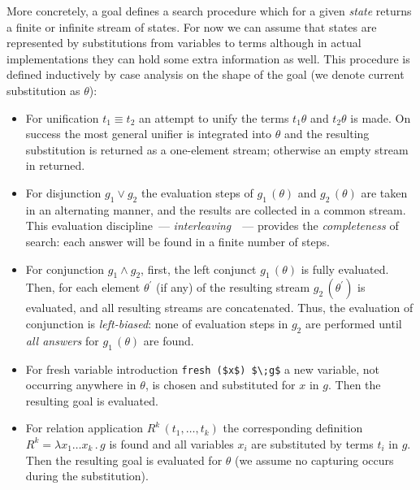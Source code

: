 More concretely, a goal defines a search procedure which for a given \emph{state} returns a finite or infinite stream of states. For now we can assume that states are represented by
substitutions from variables to terms although in actual implementations they can hold some extra information as well. This procedure is defined inductively by case analysis on the
shape of the goal (we denote current substitution as $\theta$):

\begin{itemize}
\item For unification $t_1 \equiv t_2$ an attempt to unify the terms $t_1\theta$ and $t_2\theta$ is made. On success the most general unifier is integrated into $\theta$ and the resulting substitution
  is returned as a one-element stream; otherwise an empty stream in returned.

\item For disjunction $g_1 \vee g_2$ the evaluation steps of $g_1\,(\theta)$ and $g_2\,(\theta)$ are taken in an alternating manner, and the results are collected in a common stream. This evaluation
  discipline~--- \emph{interleaving}~\cite{fair:interleaving}~--- provides the \emph{completeness} of \mk search: each answer will be found in a finite number of steps.

\item For conjunction $g_1 \wedge g_2$, first, the left conjunct $g_1\,(\theta)$ is fully evaluated. Then, for each element $\theta^\prime$ (if any) of the resulting stream $g_2\,(\theta^\prime)$ is
  evaluated, and all resulting streams are concatenated. Thus, the evaluation of conjunction is \emph{left-biased}: none of evaluation steps in $g_2$ are performed until \emph{all answers} for
  $g_1\,(\theta)$ are found.

\item For fresh variable introduction \lstinline|fresh ($x$) $\;g$| a new variable, not occurring anywhere in $\theta$, is chosen and substituted for $x$ in $g$. Then the resulting goal is evaluated.

\item For relation application $R^k\,(t_1,\dots,t_k)$ the corresponding definition $R^k=\lambda x_1\dots x_k\,.\,g$ is found and all variables $x_i$ are substituted by terms $t_i$ in
  $g$. Then the resulting goal is evaluated for $\theta$ (we assume no capturing occurs during the substitution).
\end{itemize}

